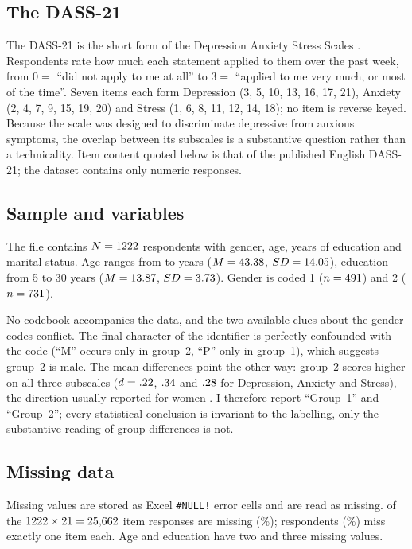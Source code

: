 \documentclass[11pt,a4paper]{article}
\begin{document}
\subsection{The DASS-21}

The DASS-21 is the short form of the Depression Anxiety Stress Scales
\citep{lovibond1995structure}. Respondents rate how much each
statement applied to them over the past week, from $0=$ ``did not apply to me at all''
to $3=$ ``applied to me very much, or most of the time''. Seven items each form
Depression (3, 5, 10, 13, 16, 17, 21), Anxiety (2, 4, 7, 9, 15, 19, 20) and Stress
(1, 6, 8, 11, 12, 14, 18); no item is reverse keyed. Because the scale was designed to
discriminate depressive from anxious symptoms, the overlap between its subscales is a
substantive question rather than a technicality. Item content quoted below is that of
the published English DASS-21; the dataset contains only numeric responses.

\subsection{Sample and variables}\label{sec:sample}

The file contains $N=1222$ respondents with gender, age, years of education and
marital status. Age ranges from \AgeMin{} to \AgeMax{} years ($M=43.38$,
$SD=14.05$), education from 5 to 30 years ($M=13.87$, $SD=3.73$). Gender is
coded 1 ($n=491$) and 2 ($n=731$).

No codebook accompanies the data, and the two available clues about the gender codes
conflict. The final character of the identifier is perfectly confounded with the code
(``M'' occurs only in group~2, ``P'' only in group~1), which suggests group~2 is
male. The mean differences point the other way: group~2 scores higher on all three
subscales ($d=.22$, $.34$ and $.28$ for Depression, Anxiety
and Stress), the direction usually reported for women
\citep{henry2005short}. I therefore report ``Group~1'' and ``Group~2'';
every statistical conclusion is invariant to the labelling, only the substantive
reading of group differences is not.

\subsection{Missing data}\label{sec:missing}

Missing values are stored as Excel \verb|#NULL!| error cells and are read as missing.
\MissCells{} of the $1222\times21=25{,}662$ item responses are missing
(\MissPct\%); \MissCases{} respondents (\MissCasesPct\%) miss exactly one item each.
Age and education have two and three missing values.
\end{document}
